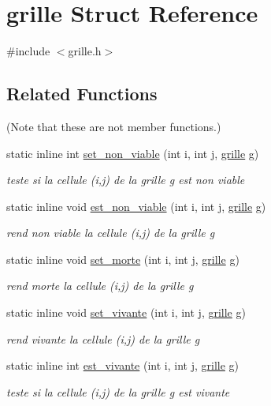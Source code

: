\hypertarget{structgrille}{}\section{grille Struct Reference}
\label{structgrille}


{\ttfamily \#include $<$grille.\+h$>$}

\subsection*{Related Functions}
(Note that these are not member functions.) \begin{DoxyCompactItemize}
\item 
static inline int \hyperlink{structgrille_a942de0ddd5c29a0f3b27b3990dff54b3}{set\+\_\+non\+\_\+viable} (int i, int j, \hyperlink{structgrille}{grille} g)
\begin{DoxyCompactList}\small\item\em teste si la cellule (i,j) de la grille g est non viable \end{DoxyCompactList}\item 
static inline void \hyperlink{structgrille_a61fe8df15841f97dbabeb4793c11345f}{est\+\_\+non\+\_\+viable} (int i, int j, \hyperlink{structgrille}{grille} g)
\begin{DoxyCompactList}\small\item\em rend non viable la cellule (i,j) de la grille g \end{DoxyCompactList}\item 
static inline void \hyperlink{structgrille_ab5ab346bdf3a9d7e3a0bfeab40416d6e}{set\+\_\+morte} (int i, int j, \hyperlink{structgrille}{grille} g)
\begin{DoxyCompactList}\small\item\em rend morte la cellule (i,j) de la grille g \end{DoxyCompactList}\item 
static inline void \hyperlink{structgrille_a889ff6b0976dfb79007387ad30d9c790}{set\+\_\+vivante} (int i, int j, \hyperlink{structgrille}{grille} g)
\begin{DoxyCompactList}\small\item\em rend vivante la cellule (i,j) de la grille g \end{DoxyCompactList}\item 
static inline int \hyperlink{structgrille_a4a27d70711027eca191df5592f922001}{est\+\_\+vivante} (int i, int j, \hyperlink{structgrille}{grille} g)
\begin{DoxyCompactList}\small\item\em teste si la cellule (i,j) de la grille g est vivante \end{DoxyCompactList}\item 

\end{DoxyCompactItemize}
